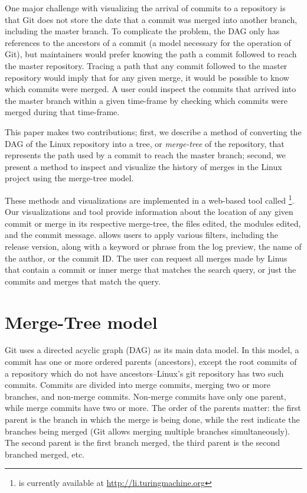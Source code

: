 \documentclass[draft]{IEEEtran}
\begin{document}
One major challenge with visualizing the arrival of commits to a
repository is that Git does not store the date that a commit was merged
into another branch, including the master branch. To complicate the
problem, the DAG only has references to the ancestors of a commit (a
model necessary for the operation of Git), but maintainers would prefer
knowing the path a commit followed to reach the master repository.
Tracing a path that any commit followed to the master repository would
imply that for any given merge, it would be possible to know which
commits were merged. A user could inspect the commits that arrived into
the master branch within a given time-frame by checking which commits
were merged during that time-frame.

This paper makes two contributions; first, we describe a method of
converting the DAG of the Linux repository into a tree, or
\emph{merge-tree} of the repository, that represents the path used by a
commit to reach the master branch; second, we present a method to
inspect and visualize the history of merges in the Linux project using
the merge-tree model.

These methods and visualizations are implemented in a web-based tool
called \tool\footnote{\tool is currently available at
  \url{http://li.turingmachine.org}}.  Our visualizations and tool
provide information about the location of any given commit or merge in
its respective merge-tree, the files edited, the modules edited, and the
commit message. \tool allows users to apply various filters, including
the release version, along with a keyword or phrase from the log
preview, the name of the author, or the commit ID. The user can request
all merges made by Linus that contain a commit or inner merge that
matches the search query, or just the commits and merges that match the
query.

\section{Merge-Tree model}
\label{sec:mergetree}

Git uses a directed acyclic graph (DAG) as its main data model. In this
model, a commit has one or more ordered parents (ancestors), except the
root commits of a repository which do not have ancestors--Linux's git
repository has two such commits.  Commits are divided into merge
commits, merging two or more branches, and non-merge commits. Non-merge
commits have only one parent, while merge commits have two or more. The
order of the parents matter: the first parent is the branch in which the
merge is being done, while the rest indicate the branches being merged
(Git allows merging multiple branches simultaneously). The second parent
is the first branch merged, the third parent is the second branched
merged, etc.
\end{document}
